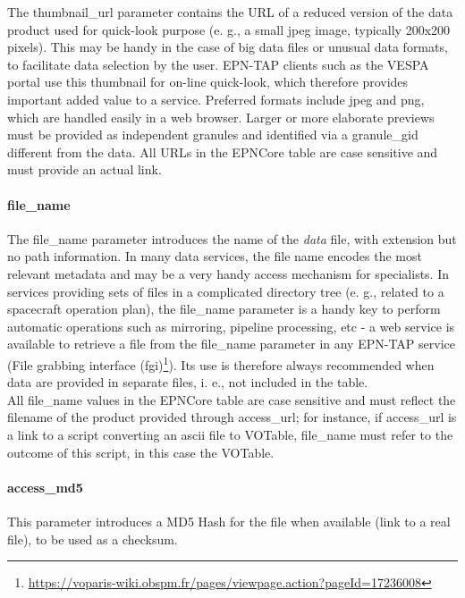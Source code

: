 \documentclass[11pt,a4paper]{ivoa}
\begin{document}
The thumbnail\_url parameter contains the URL of a reduced version of the data product used for quick-look purpose (e. g., a small jpeg image, typically 200x200 pixels). This may be handy in the case of big data files or unusual data formats, to facilitate data selection by the user. EPN-TAP clients such as the VESPA portal use this thumbnail for on-line quick-look, which therefore provides important added value to a service. Preferred formats include jpeg and png, which are handled easily in a web browser. Larger or more elaborate previews must be provided as independent granules and identified via a granule\_gid different from the data. All URLs in the EPNCore table are case sensitive and must provide an actual link.

\paragraph{file\_name}

The file\_name parameter introduces the name of the \emph{data} file, with extension but no path information. In many data services, the file name encodes the most relevant metadata and may be a very handy access mechanism for specialists. In services providing sets of files in a complicated directory tree (e. g., related to a spacecraft operation plan), the file\_name parameter is a handy key to perform automatic operations such as mirroring, pipeline processing, etc - a web service is available to retrieve a file from the file\_name parameter in any EPN-TAP service (File grabbing interface (fgi)\footnote{\url{https://voparis-wiki.obspm.fr/pages/viewpage.action?pageId=17236008}}). Its use is therefore always recommended when data are provided in separate files, i. e., not included in the table.\\All file\_name values in the EPNCore table are case sensitive and must reflect the filename of the product provided through access\_url; for instance, if access\_url is a link to a script converting an ascii file to VOTable, file\_name must refer to the outcome of this script, in this case the VOTable.

\paragraph{access\_md5}

This parameter introduces a MD5 Hash for the file when available (link to a real file), to be used as a checksum.\\
\end{document}
